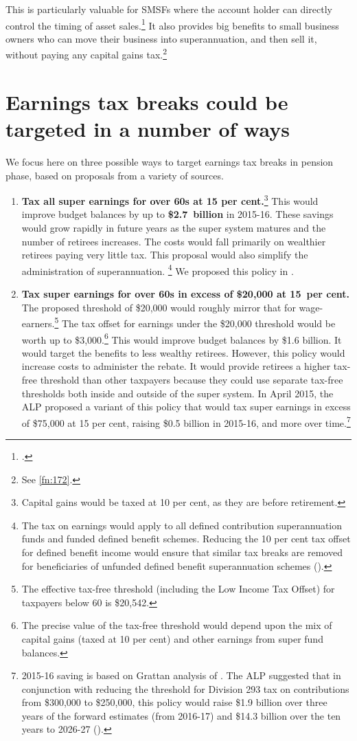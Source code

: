 \documentclass{grattanAlpha}
\begin{document}
This is particularly valuable for SMSFs where the account holder can directly control the timing of asset sales.\footcite[][6]{Mercer2015SubmissionToReThink} It also provides big benefits to small business owners who can move their business into superannuation, and then sell it, without paying any capital gains tax.\footnote{See \vref{fn:172}.} 

\section{Earnings tax breaks could be targeted in a number of ways\label{sec:SUPER-6-3}}
We focus here on three possible ways to target earnings tax breaks in pension phase, based on proposals from a variety of sources.

\begin{enumerate}
\item \textbf{Tax all super earnings for over 60s at 15 per cent.}\footnote{Capital gains would be taxed at 10 per cent, as they are before retirement.}  This would improve budget balances by up to \textbf{\$2.7~billion} in 2015-16. These savings would grow rapidly in future years as the super system matures and the number of retirees increases. The costs would fall primarily on wealthier retirees paying very little tax. This proposal would also simplify the administration of superannuation.%
\footnote{The tax on earnings would apply to all defined contribution superannuation funds and funded defined benefit schemes. Reducing the 10 per cent tax offset for defined benefit income would ensure that similar tax breaks are removed for beneficiaries of unfunded defined benefit superannuation schemes (\textcite{ALP2015FairerSuper}).}  We proposed this policy in . 
%
\item \textbf{Tax super earnings for over 60s in excess of \$20,000 at 15~per cent.} The proposed threshold of \$20,000 would roughly mirror that for wage-earners.\footnote{The effective tax-free threshold (including the Low Income Tax Offset) for taxpayers below 60 is \$20,542.}  The tax offset for earnings under the \$20,000 threshold would be worth up to \$3,000.\footnote{The precise value of the tax-free threshold would depend upon the mix of capital gains (taxed at 10 per cent) and other earnings from super fund balances.}  This would improve budget balances by \$1.6 billion. It would target the benefits to less wealthy retirees. However, this policy would increase costs to administer the rebate. It would provide retirees a higher tax-free threshold than other taxpayers because they could use separate tax-free thresholds both inside and outside of the super system. In April 2015, the ALP proposed a variant of this policy that would tax super earnings in excess of \$75,000 at 15 per cent, raising \$0.5 billion in 2015-16, and more over time.\footnote{2015-16 saving is based on Grattan analysis of \textcite{ABS2013t}. The ALP suggested that in conjunction with reducing the threshold for Division 293 tax on contributions from \$300,000 to \$250,000, this policy would raise \$1.9 billion over three years of the forward estimates (from 2016-17) and \$14.3 billion over the ten years to 2026-27 (\textcite{ALP2015FairerSuper}).}

\end{enumerate}
\end{document}
